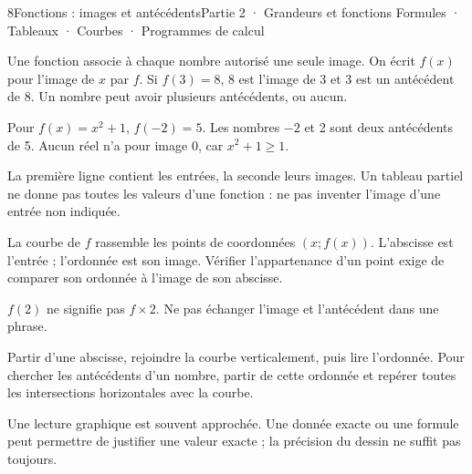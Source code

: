 \begin{ouverture}[courbe]{8}{Fonctions : images et antécédents}{Partie 2 · Grandeurs et fonctions}
{Formules · Tableaux · Courbes · Programmes de calcul}
\end{ouverture}
\pagestyle{otMain}\essentiel\fontsize{11}{15}\selectfont
{}
\begin{definition}Une fonction associe à chaque nombre autorisé une seule image. On écrit $f(x)$ pour l’image de $x$ par $f$. Si $f(3)=8$, 8 est l’image de 3 et 3 est un antécédent de 8. Un nombre peut avoir plusieurs antécédents, ou aucun.\end{definition}
\begin{exemple}Pour $f(x)=x^2+1$, $f(-2)=5$. Les nombres $-2$ et 2 sont deux antécédents de 5. Aucun réel n’a pour image 0, car $x^2+1\ge1$.\end{exemple}
\begin{savoirfaire}La première ligne contient les entrées, la seconde leurs images. Un tableau partiel ne donne pas toutes les valeurs d’une fonction : ne pas inventer l’image d’une entrée non indiquée.\end{savoirfaire}
\begin{definition}La courbe de $f$ rassemble les points de coordonnées $(x;f(x))$. L’abscisse est l’entrée ; l’ordonnée est son image. Vérifier l’appartenance d’un point exige de comparer son ordonnée à l’image de son abscisse.\end{definition}
\begin{attention}$f(2)$ ne signifie pas $f\times2$. Ne pas échanger l’image et l’antécédent dans une phrase.\end{attention}
\clearpage
{}
\begin{savoirfaire}Partir d’une abscisse, rejoindre la courbe verticalement, puis lire l’ordonnée. Pour chercher les antécédents d’un nombre, partir de cette ordonnée et repérer toutes les intersections horizontales avec la courbe.\end{savoirfaire}
\begin{attention}Une lecture graphique est souvent approchée. Une donnée exacte ou une formule peut permettre de justifier une valeur exacte ; la précision du dessin ne suffit pas toujours.\end{attention}
